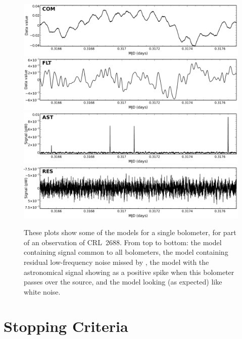 \begin{figure}
\begin{center}
  \includegraphics[width=\linewidth]{sc21_com} \\
  \includegraphics[width=\linewidth]{sc21_flt} \\
  \includegraphics[width=\linewidth]{sc21_ast} \\
  \includegraphics[width=\linewidth]{sc21_res} \\
\end{center}
\caption[Iterative models in the time domain]{\small These plots show
some of the models for a single bolometer, for part of an
observation of CRL~2688. From top to bottom: the  model
containing signal common to all bolometers, the  model
containing residual low-frequency noise missed by , the
 model with the astronomical signal showing as a positive
spike when this bolometer passes over the source, and the 
model looking (as expected) like white noise.}
\label{fig:itercomp}
\end{figure}


\section{Stopping Criteria}
\label{sec:converge}

